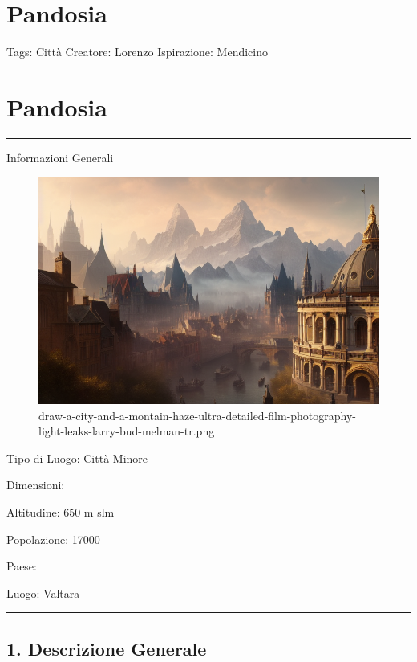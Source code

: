 \section{Pandosia}\label{pandosia}

Tags: Città Creatore: Lorenzo Ispirazione: Mendicino

\section{Pandosia}\label{pandosia-1}

\begin{center}\rule{0.5\linewidth}{0.5pt}\end{center}

Informazioni Generali

\begin{figure}
\centering
\includegraphics{draw-a-city-and-a-montain-haze-ultra-detailed-film-photography-light-leaks-larry-bud-melman-tr.png}
\caption{draw-a-city-and-a-montain-haze-ultra-detailed-film-photography-light-leaks-larry-bud-melman-tr.png}
\end{figure}

Tipo di Luogo: Città Minore

Dimensioni:

Altitudine: 650 m slm

Popolazione: 17000

Paese:

Luogo: Valtara

\begin{center}\rule{0.5\linewidth}{0.5pt}\end{center}

\subsection{1. Descrizione Generale}\label{descrizione-generale}

